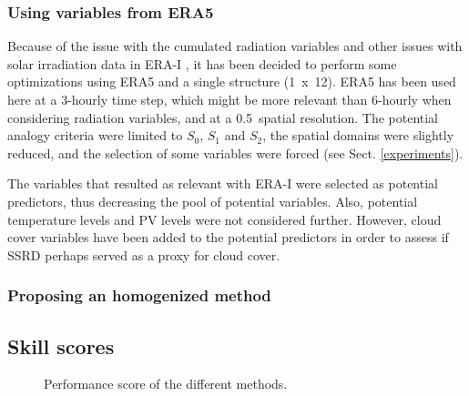 \documentclass[draft]{agujournal2019}
\begin{document}
\subsubsection{Using variables from ERA5}

Because of the issue with the cumulated radiation variables and other issues with solar irradiation data in ERA-I \cite{Boilley2015}, it has been decided to perform some optimizations using ERA5 and a single structure (1~x~12). ERA5 has been used here at a 3-hourly time step, which might be more relevant than 6-hourly when considering radiation variables, and at a 0.5\degree\ spatial resolution. The potential analogy criteria were limited to $S_{0}$, $S_{1}$ and $S_{2}$, the spatial domains were slightly reduced, and the selection of some variables were forced (see Sect. \ref{experiments}).

The variables that resulted as relevant with ERA-I were selected as potential predictors, thus decreasing the pool of potential variables. Also, potential temperature levels and PV levels were not considered further. However, cloud cover variables have been added to the potential predictors in order to assess if SSRD perhaps served as a proxy for cloud cover.





\subsubsection{Proposing an homogenized method}




\subsection{Skill scores}
\label{skill_score}


\begin{figure}[hbt]
	\noindent{}
	\caption{Performance score of the different methods.}
	\label{fig_scores}
\end{figure}
\end{document}
